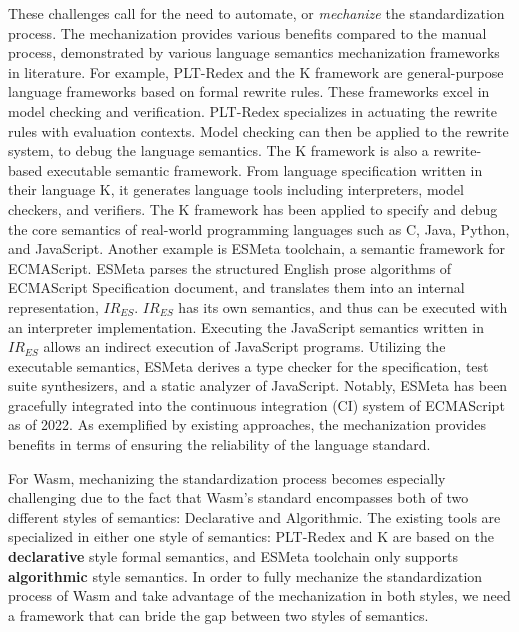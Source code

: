 These challenges call for the need to automate, or \textit{mechanize} the
standardization process. The mechanization provides various benefits
compared to the manual process, demonstrated by various language semantics
mechanization frameworks in literature. For example, PLT-Redex and the K
framework are general-purpose language frameworks based on formal rewrite
rules.  These frameworks excel in model checking and verification.  PLT-Redex
specializes in actuating the rewrite rules with evaluation contexts.  Model
checking can then be applied to the rewrite system, to debug the language
semantics.  The K framework is also a rewrite-based executable semantic
framework.  From language specification written in their language K, it
generates language tools including interpreters, model checkers, and verifiers.
The K framework has been applied to specify and debug the core semantics of
real-world programming languages such as C, Java, Python, and JavaScript.
Another example is ESMeta toolchain, a semantic framework for ECMAScript.
ESMeta parses the structured English prose algorithms of ECMAScript
Specification document, and translates them into an internal representation,
$IR_{ES}$.  $IR_{ES}$ has its own semantics, and thus can be executed with an
interpreter implementation.  Executing the JavaScript semantics written in
$IR_{ES}$ allows an indirect execution of JavaScript programs.  Utilizing the
executable semantics, ESMeta derives a type checker for the specification, test
suite synthesizers, and a static analyzer of JavaScript.  Notably, ESMeta has
been gracefully integrated into the continuous integration (CI) system of
ECMAScript as of 2022. As exemplified by existing approaches, the mechanization
provides benefits in terms of ensuring the reliability of the language standard.


For Wasm, mechanizing the standardization process becomes especially
challenging due to the fact that Wasm's standard encompasses both of two different
styles of semantics: Declarative and Algorithmic. The existing tools are specialized in
either one style of semantics: PLT-Redex and K are based on the \textbf{declarative}
style formal semantics, and ESMeta toolchain only supports \textbf{algorithmic} style
semantics.  In order to fully mechanize the standardization process of Wasm and
take advantage of the mechanization in both styles, we need a framework that
can bride the gap between two styles of semantics.


